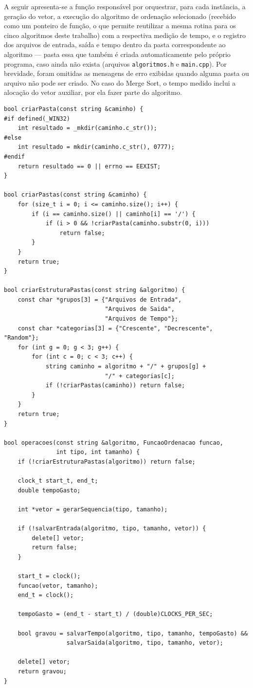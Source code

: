 \qquad A seguir apresenta-se a função responsável por orquestrar, para
cada instância, a geração do vetor, a execução do algoritmo de
ordenação selecionado (recebido como um ponteiro de função, o que
permite reutilizar a mesma rotina para os cinco algoritmos deste
trabalho) com a respectiva medição de tempo, e o registro dos
arquivos de entrada, saída e tempo dentro da pasta correspondente ao
algoritmo --- pasta essa que também é criada automaticamente pelo
próprio programa, caso ainda não exista (arquivos
\texttt{algoritmos.h} e \texttt{main.cpp}). Por brevidade, foram omitidas
as mensagens de erro exibidas quando alguma pasta ou arquivo não pode
ser criado. No caso do Merge Sort, o tempo medido inclui a alocação do
vetor auxiliar, por ela fazer parte do algoritmo.

{\small
\begin{verbatim}
bool criarPasta(const string &caminho) {
#if defined(_WIN32)
    int resultado = _mkdir(caminho.c_str());
#else
    int resultado = mkdir(caminho.c_str(), 0777);
#endif
    return resultado == 0 || errno == EEXIST;
}

bool criarPastas(const string &caminho) {
    for (size_t i = 0; i <= caminho.size(); i++) {
        if (i == caminho.size() || caminho[i] == '/') {
            if (i > 0 && !criarPasta(caminho.substr(0, i)))
                return false;
        }
    }
    return true;
}

bool criarEstruturaPastas(const string &algoritmo) {
    const char *grupos[3] = {"Arquivos de Entrada",
                             "Arquivos de Saida",
                             "Arquivos de Tempo"};
    const char *categorias[3] = {"Crescente", "Decrescente", "Random"};
    for (int g = 0; g < 3; g++) {
        for (int c = 0; c < 3; c++) {
            string caminho = algoritmo + "/" + grupos[g] +
                             "/" + categorias[c];
            if (!criarPastas(caminho)) return false;
        }
    }
    return true;
}

bool operacoes(const string &algoritmo, FuncaoOrdenacao funcao,
               int tipo, int tamanho) {
    if (!criarEstruturaPastas(algoritmo)) return false;

    clock_t start_t, end_t;
    double tempoGasto;

    int *vetor = gerarSequencia(tipo, tamanho);

    if (!salvarEntrada(algoritmo, tipo, tamanho, vetor)) {
        delete[] vetor;
        return false;
    }

    start_t = clock();
    funcao(vetor, tamanho);
    end_t = clock();

    tempoGasto = (end_t - start_t) / (double)CLOCKS_PER_SEC;

    bool gravou = salvarTempo(algoritmo, tipo, tamanho, tempoGasto) &&
                  salvarSaida(algoritmo, tipo, tamanho, vetor);

    delete[] vetor;
    return gravou;
}
\end{verbatim}
}
